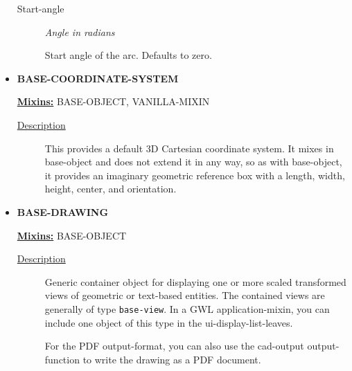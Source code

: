 \documentclass [11pt]{book}
\begin{document}
\begin{itemize}
\begin{description}
\item [Start-angle]
\emph{Angle in radians}

 Start angle of the arc. Defaults to zero.




\end{description}







\item {}
\textbf{BASE-COORDINATE-SYSTEM}


\textbf{
\underline{Mixins:}} BASE-OBJECT, VANILLA-MIXIN





\begin{description}

\item [
\underline{Description}]


This provides a default 3D Cartesian
   coordinate system. It mixes in base-object and does not extend it
   in any way, so as with base-object, it provides an imaginary
   geometric reference box with a length, width, height, center, and
   orientation.



\end{description}









\item {}
\textbf{BASE-DRAWING}


\textbf{
\underline{Mixins:}} BASE-OBJECT





\begin{description}

\item [
\underline{Description}]


Generic container object for displaying one or more scaled
transformed views of geometric or text-based entities. The contained views are generally 
of type \texttt{base-view}. In a GWL application-mixin, you can include one 
object of this type in the ui-display-list-leaves.

For the PDF output-format, you can also use the cad-output output-function to write the 
drawing as a PDF document. 


\end{description}
\end{itemize}
\end{document}
